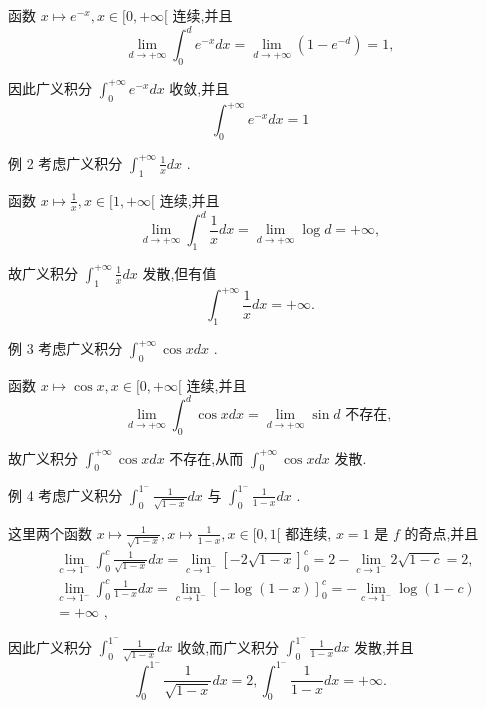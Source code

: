 函数 $x \mapsto  {e}^{-x},x \in  \lbrack 0, + \infty \lbrack$ 连续,并且
$$\mathop{\lim }\limits_{{d \rightarrow   + \infty }}{\int }_{0}^{d}{e}^{-x}{dx} = \mathop{\lim }\limits_{{d \rightarrow   + \infty }}\left( {1 - {e}^{-d}}\right)  = 1,$$

因此广义积分 ${\int }_{0}^{+\infty }{e}^{-x}{dx}$ 收敛,并且
$${\int }_{0}^{+\infty }{e}^{-x}{dx} = 1$$

例 2 考虑广义积分 ${\int }_{1}^{+\infty }\frac{1}{x}{dx}$ .

函数 $x \mapsto  \frac{1}{x},x \in  \lbrack 1, + \infty \lbrack$ 连续,并且
$$\mathop{\lim }\limits_{{d \rightarrow   + \infty }}{\int }_{1}^{d}\frac{1}{x}{dx} = \mathop{\lim }\limits_{{d \rightarrow   + \infty }}\log d =  + \infty ,$$

故广义积分 ${\int }_{1}^{+\infty }\frac{1}{x}{dx}$ 发散,但有值
$${\int }_{1}^{+\infty }\frac{1}{x}{dx} =  + \infty .$$

例 3 考虑广义积分 ${\int }_{0}^{+\infty }\cos {xdx}$ .

函数 $x \mapsto  \cos x,x \in  \lbrack 0, + \infty \lbrack$ 连续,并且
$$\mathop{\lim }\limits_{{d \rightarrow   + \infty }}{\int }_{0}^{d}\cos {xdx} = \mathop{\lim }\limits_{{d \rightarrow   + \infty }}\sin d\text{ 不存在, }$$

故广义积分 ${\int }_{0}^{+\infty }\cos {xdx}$ 不存在,从而 ${\int }_{0}^{+\infty }\cos {xdx}$ 发散.

例 4 考虑广义积分 ${\int }_{0}^{{1}^{ - }}\frac{1}{\sqrt{1 - x}}{dx}$ 与 ${\int }_{0}^{{1}^{ - }}\frac{1}{1 - x}{dx}$ .

这里两个函数 $x \mapsto  \frac{1}{\sqrt{1 - x}},x \mapsto  \frac{1}{1 - x},x \in  \lbrack 0,1\lbrack$ 都连续, $x = 1$ 是 $f$ 的奇点,并且
\begin{align*}
	&\mathop{\lim }\limits_{{c \rightarrow  {1}^{ - }}}{\int }_{0}^{c}\frac{1}{\sqrt{1 - x}}{dx} = \mathop{\lim }\limits_{{c \rightarrow  {1}^{ - }}}{\left\lbrack  -2\sqrt{1 - x}\right\rbrack  }_{0}^{c} = 2 - \mathop{\lim }\limits_{{c \rightarrow  {1}^{ - }}}2\sqrt{1 - c} = 2,\\
	&\mathop{\lim }\limits_{{c \rightarrow  {1}^{ - }}}{\int }_{0}^{c}\frac{1}{1 - x}{dx} = \mathop{\lim }\limits_{{c \rightarrow  {1}^{ - }}}{\left\lbrack  -\log \left( 1 - x\right) \right\rbrack  }_{0}^{c} =  - \mathop{\lim }\limits_{{c \rightarrow  {1}^{ - }}}\log \left( {1 - c}\right)\\
	&=  + \infty \text{ , }
\end{align*}

因此广义积分 ${\int }_{0}^{{1}^{ - }}\frac{1}{\sqrt{1 - x}}{dx}$ 收敛,而广义积分 ${\int }_{0}^{{1}^{ - }}\frac{1}{1 - x}{dx}$ 发散,并且
$${\int }_{0}^{{1}^{ - }}\frac{1}{\sqrt{1 - x}}{dx} = 2,{\int }_{0}^{{1}^{ - }}\frac{1}{1 - x}{dx} =  + \infty .$$

